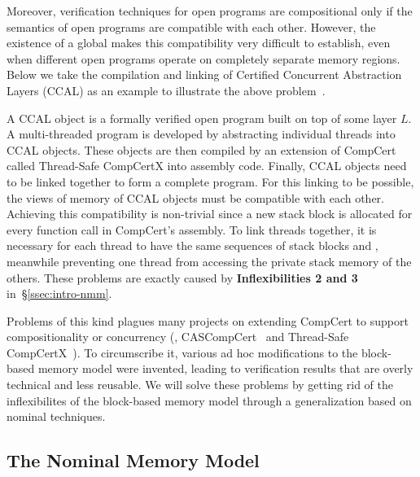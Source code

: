 Moreover,
verification techniques for open programs are compositional only if
the semantics of open programs are compatible with each other.
However, the existence of a global \nextblock makes this compatibility
very difficult to establish, even when different open programs operate
on completely separate memory regions.
Below we take the compilation and linking of Certified Concurrent
Abstraction Layers (CCAL) as an example to illustrate the above
problem~\cite{ccal18}.

A CCAL object is a formally verified open program built on top of some
layer $L$. A multi-threaded program is developed by abstracting
individual threads into CCAL objects. These objects are then
compiled by an extension of CompCert called Thread-Safe CompCertX into
assembly code. Finally, CCAL objects need to be linked together to
form a complete program. 
For this linking to be possible, the views of memory of CCAL
objects must be compatible with each other. Achieving this
compatibility is non-trivial since 
a new stack block is
allocated for every function call in CompCert's assembly. To
link threads together, it is necessary for each thread to have
the same sequences of
stack blocks and \nextblock, meanwhile preventing one
thread from accessing the private stack memory of the others.
%
%
These problems are exactly caused by
\textbf{Inflexibilities 2 and 3} in~\S\ref{ssec:intro-nmm}.

Problems of this kind plagues many projects on
extending CompCert to support compositionality or concurrency (\eg,
CASCompCert~\cite{cascompcert} and Thread-Safe
CompCertX~\cite{ccal18}). To circumscribe it, various ad hoc
modifications to the block-based memory model were invented, leading to
verification results that are overly technical and less reusable.
We will solve these problems by getting rid of the inflexibilites of
the block-based memory model through a generalization based on nominal
techniques.

\subsection{The Nominal Memory Model}
\label{ssec:nominal-nmm}

